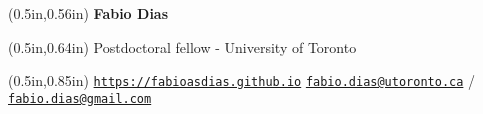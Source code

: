 \documentclass[12pt]{article}
\begin{document}
\begin{textblock*}{2.5in}(0.5in,0.56in)
  \LARGE \bf Fabio {\color{pblue} Dias}
\end{textblock*}
\begin{textblock*}{7.2in}(0.5in,0.64in)   %
  \sffamily
  \hfill Postdoctoral fellow - University of Toronto\\
\end{textblock*}
\begin{textblock*}{7.2in}(0.5in,0.85in)   %
  \sffamily
  \href{https://fabioasdias.github.io}{\nolinkurl{https://fabioasdias.github.io}} \hfill \href{mailto:fabio.dias@utoronto.ca}{\nolinkurl{fabio.dias@utoronto.ca}} / \href{mailto:fabio.dias@gmail.com}{\nolinkurl{fabio.dias@gmail.com}}\\
  
\end{textblock*}

\selectfont 
\end{document}
